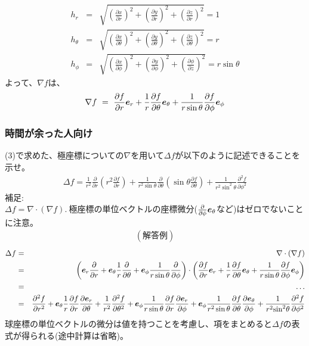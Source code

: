 \documentclass[a4paper,11pt,fleqn]{jarticle}
\def \vec#1{\mbox{\boldmath $#1$}} %
\begin{document}
\begin{eqnarray*}
h_r&=&\sqrt{\left(\frac{\partial{x}}{\partial{r}}\right)^2+\left(\frac{\partial{y}}{\partial{r}}\right)^2+\left(\frac{\partial{z}}{\partial{r}}\right)^2}=1\\
h_\theta&=&\sqrt{\left(\frac{\partial{x}}{\partial{\theta}}\right)^2+\left(\frac{\partial{y}}{\partial{\theta}}\right)^2+\left(\frac{\partial{z}}{\partial{\theta}}\right)^2}=r\\
h_{\phi}&=&\sqrt{\left(\frac{\partial{x}}{\partial \phi}\right)^2+\left(\frac{\partial{y}}{\partial  \phi}\right)^2+\left(\frac{\partial \phi}{\partial z}\right)^2}=r\sin\theta
\end{eqnarray*}
よって、$\nabla f$は、
\begin{eqnarray*}
\nabla f ~=~ \frac{\partial f}{\partial r}\vec{e}_r+\frac{1}{r}\frac{\partial f}{\partial \theta}\vec{e}_{\theta}+\frac{1}{r\sin\theta}\frac{\partial f}{\partial \phi}\vec{e}_{\phi}
\end{eqnarray*}

\newpage
\subsubsection{時間が余った人向け}
(3)で求めた、極座標についての$\nabla$を用いて$\Delta f$が以下のように記述できることを示せ。
\begin{eqnarray*}
\Delta f=\frac{1}{r^2}\frac{\partial}{\partial r}\left(r^2\frac{\partial f}{\partial r}\right)+\frac{1}{r^2\sin\theta}\frac{\partial}{\partial \theta}\left(\sin\theta\frac{\partial f}{\partial \theta}\right)+\frac{1}{r^2{\sin}^2\theta}\frac{{\partial}^2 f}{\partial {\phi}^2}
\end{eqnarray*}
補足:\\
$\Delta f=\nabla\cdot (\nabla f).~$極座標の単位ベクトルの座標微分($\frac{\partial}{\partial \phi}\vec{e}_{\theta}$など)はゼロでないことに注意。
\begin{eqnarray*}
(解答例)
\end{eqnarray*}
\begin{eqnarray*}
\Delta f &=& \nabla\cdot (\nabla f)\\
&=& \left( \vec{e}_r\frac{\partial}{\partial r}+\vec{e}_{\theta}\frac{1}{r}\frac{\partial}{\partial \theta}+\vec{e}_{\phi}\frac{1}{r\sin\theta}\frac{\partial}{\partial \phi}\right)\cdot\left(\frac{\partial f}{\partial r}\vec{e}_r+\frac{1}{r}\frac{\partial f}{\partial \theta}\vec{e}_{\theta}+\frac{1}{r\sin\theta}\frac{\partial f}{\partial \phi}\vec{e}_{\phi} \right)\\
&=& \ldots \\
&=& \frac{{\partial}^2 f}{\partial r^2}+\vec{e}_{\theta}\frac{1}{r}\frac{\partial f}{\partial r}\frac{\partial \vec{e}_r}{\partial \theta}+\frac{1}{r^2}\frac{{\partial}^2 f}{\partial {\theta}^2}+\vec{e}_{\phi}\frac{1}{r\sin\theta}\frac{\partial f}{\partial r}\frac{\partial \vec{e}_r}{\partial \phi}+\vec{e}_{\phi}\frac{1}{r^2\sin\theta}\frac{\partial f}{\partial \theta}\frac{\partial \vec{e}_\theta}{\partial \phi}+\frac{1}{r^2{\sin}^2\theta}\frac{{\partial}^2 f}{\partial {\phi}^2}
\end{eqnarray*}
球座標の単位ベクトルの微分は値を持つことを考慮し、項をまとめると$\Delta f$の表式が得られる(途中計算は省略)。
\end{document}
